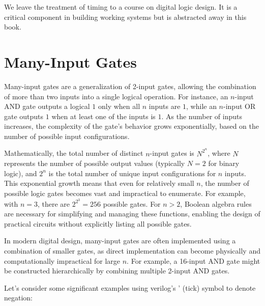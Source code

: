 We leave the treatment of timing to a course on digital logic design. It is a critical component in building working systems but is abstracted away in this book.

\section{Many-Input Gates}
Many-input gates are a generalization of 2-input gates, allowing the combination of more than two inputs into a single logical operation. For instance, an \( n \)-input AND gate outputs a logical \( 1 \) only when all \( n \) inputs are \( 1 \), while an \( n \)-input OR gate outputs \( 1 \) when at least one of the inputs is \( 1 \). As the number of inputs increases, the complexity of the gate's behavior grows exponentially, based on the number of possible input configurations.

Mathematically, the total number of distinct \( n \)-input gates is \( N^{2^n} \), where \( N \) represents the number of possible output values (typically \( N = 2 \) for binary logic), and \( 2^n \) is the total number of unique input configurations for \( n \) inputs. This exponential growth means that even for relatively small \( n \), the number of possible logic gates becomes vast and impractical to enumerate. For example, with \( n = 3 \), there are \( 2^{2^3} = 256 \) possible gates. For \( n > 2 \), Boolean algebra rules are necessary for simplifying and managing these functions, enabling the design of practical circuits without explicitly listing all possible gates.

In modern digital design, many-input gates are often implemented using a combination of smaller gates, as direct implementation can become physically and computationally impractical for large \( n \). For example, a 16-input AND gate might be constructed hierarchically by combining multiple 2-input AND gates. 

Let's consider some significant examples using verilog's ' (tick) symbol to denote negation:

